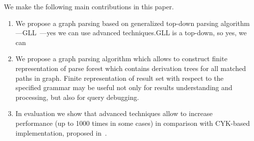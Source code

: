 \documentclass[runningheads,a4paper]{llncs}
\begin{document}
We make the following main contributions in this paper.
\begin{enumerate}
\item We propose a graph parsing based on generalized top-down parsing algorithm---GLL~\cite{scott2010gll}---yes we can use advanced techniques.GLL is a top-down, so yes, we can~\cite{Hellings16}
\item We propose a graph parsing algorithm which allows to construct finite representation of parse forest which contains derivation trees for all matched paths in graph.
Finite representation of result set with respect to the specified grammar may be useful not only for results understanding and processing, but also for query debugging. 
\item In evaluation we show that advanced techniques allow to increase performance (up to 1000 times in some cases) in comparison with CYK-based implementation, proposed in~\cite{CFGonRDF}.
\end{enumerate}




%








%

\end{document}
